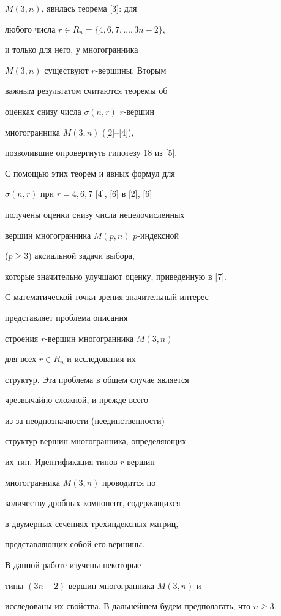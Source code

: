 $M(3,n)$, явилась теорема [3]: для


любого числа $r\in R_n=\{4,6,7,\dotsc,3n-2\}$, 


и только для него, у многогранника


$M(3,n)$ существуют $r$-вершины. Вторым 


важным результатом считаются теоремы об


оценках снизу числа $\sigma (n,r)$ $r$-вершин 


многогранника $M(3,n)$ ([2]--[4]),


позволившие опровергнуть гипотезу 18 из [5]. 


С помощью этих теорем и явных формул для


$\sigma (n,r)$ при $r=4,6,7$ [4], [6] в [2], [6] 


получены оценки снизу числа нецелочисленных


вершин многогранника $M(p,n)$ $p$-индексной


($p\geq 3$) аксиальной задачи выбора,


которые значительно улучшают оценку, приведенную в [7].





С математической точки зрения значительный интерес 


представляет проблема описания


строения $r$-вершин многогранника $M(3,n)$ 


для всех $r\in R_n$ и исследования их


структур. Эта проблема в общем случае является 


чрезвычайно сложной, и прежде всего


из-за неоднозначности (неединственности) 


структур вершин многогранника, определяющих


их тип. Идентификация типов $r$-вершин 


многогранника $M(3,n)$ проводится по


количеству дробных компонент, содержащихся 


в двумерных сечениях трехиндексных матриц,


представляющих собой его вершины.





В данной работе изучены некоторые 


типы $(3n-2)$-вершин многогранника $M(3,n)$ и


исследованы их свойства. В дальнейшем будем предполагать, что $n\geq 3$.


